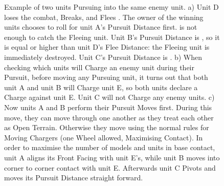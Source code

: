 {\begin{figure}[!htbp]
	\renewcommand{\figbiglettersize}{20}
	\begin{minipage}{0.55\textwidth}
	\def\svgwidth{\textwidth}
	
	\end{minipage}\hfill\begin{minipage}{0.43\textwidth}
	\caption{Example of two units Pursuing into the same enemy unit.\captionpar
	a) Unit D loses the combat, Breaks, and Flees . The owner of the winning units chooses to roll for unit A's Pursuit Distance first.  is not enough to catch the Fleeing unit. Unit B's Pursuit Distance is , so it is equal or higher than unit D's Flee Distance: the Fleeing unit is immediately destroyed. Unit C's Pursuit Distance is .\vspace*{4.5cm}\captionpar
	b) When checking which units will Charge an enemy unit during their Pursuit, before moving any Pursuing unit, it turns out that both unit A and unit B will Charge unit E, so both units declare a Charge against unit E. Unit C will not Charge any enemy units.\vspace*{3.3cm}\captionpar
	c) Now units A and B perform their Pursuit Moves first. During this move, they can move through one another as they treat each other as Open Terrain. Otherwise they move using the normal rules for Moving Chargers (one Wheel allowed, Maximising Contact). In order to maximise the number of models and units in base contact, unit A aligns its Front Facing with unit E's, while unit B moves into corner to corner contact with unit E. Afterwards unit C Pivots and moves its Pursuit Distance straight forward.}
	\label{figure/two_units_pursuit}
	\end{minipage}
\end{figure}

\newcommand{\figPursA}{a)}
\newcommand{\figPursB}{b)}
\newcommand{\figPursC}{c)}
\newcommand{\figPursD}{d)}
\newcommand{\figPursTextA}{\begin{minipage}{0.45\unitlength}\begin{center}\normalfontsize{The Front Facing of the Pursuing unit touches a friendly Unit Boundary.}\end{center}\end{minipage}}
\newcommand{\figPursTextB}{\begin{minipage}{0.45\unitlength}\begin{center}\normalfontsize{The Front Facing of the Pursuing unit touches an enemy Unit Boundary.}\end{center}\end{minipage}}
\newcommand{\figPursTextC}{\begin{minipage}[b]{0.4\unitlength}\normalfontsize{The first obstacle would be an enemy unit.}\end{minipage}}
\newcommand{\figPursTextD}{\begin{minipage}[b]{0.4\unitlength}\normalfontsize{The first obstacle would be an obstruction.}\end{minipage}}

}
